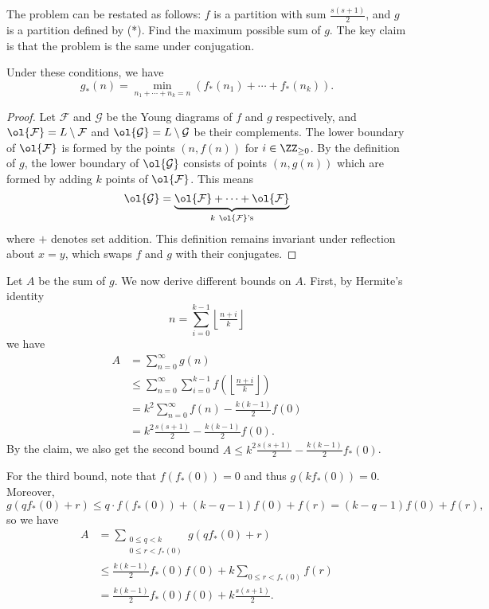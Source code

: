 \documentclass[11pt]{scrartcl}
\begin{document}
The problem can be restated as follows: $f$ is a partition with sum
$\frac{s(s+1)}{2}$, and $g$ is a partition defined by (*). Find the maximum
possible sum of $g$. The key claim is that the problem is the
same under conjugation.
\begin{claim*}
  Under these conditions, we have
  \[
    g_*(n) = \min_{n_1+\dotsb+n_k=n}(f_*(n_1)+\dotsb+f_*(n_k)).
  \]
\end{claim*}

\begin{proof}
  Let $\mathcal{F}$ and $\mathcal{G}$ be the Young diagrams of $f$ and $g$
  respectively, and $\ol{\mathcal{F}} = L\setminus \mathcal{F}$ and
  $\ol{\mathcal{G}} = L\setminus \mathcal{G}$ be their complements. The
  lower boundary of $\ol{\mathcal{F}}$ is formed by the points $(n, f(n))$
  for $i\in \ZZ_{\geq 0}$. By the definition of $g$, the lower boundary
  of $\ol{\mathcal{G}}$
  consists of points $(n, g(n))$ which are formed by adding $k$ points of
  $\ol{\mathcal{F}}$. This means
  \[
    \ol{\mathcal{G}} = \underbrace{\ol{\mathcal{F}} + \dots +
    \ol{\mathcal{F}}}_{k \ \ol{\mathcal{F}}\text{'s}}
  \]
  where $+$ denotes set addition. This definition remains invariant under
  reflection about $x=y$, which swaps $f$ and $g$ with their conjugates.
\end{proof}

Let $A$ be the sum of $g$. We now derive different bounds on $A$. First, by
Hermite's identity
\[n = \sum_{i=0}^{k-1}\left\lfloor\tfrac{n+i}{k}\right\rfloor\]
we have
\begin{align*}
  A &= \sum_{n=0}^{\infty} g(n) \\
    & \leq \sum_{n=0}^{\infty} \sum_{i=0}^{k-1} f\left( \left\lfloor
    \tfrac{n+i}{k} \right\rfloor \right) \\
    &= k^2 \sum_{n=0}^{\infty}f(n) - \frac{k(k-1)}{2}f(0) \\
    &= k^2\frac{s(s+1)}{2}-\frac{k(k-1)}{2}f(0).
\end{align*}
By the claim, we also get the second bound $A \leq k^2 \frac{s(s+1)}{2} -
\frac{k(k-1)}{2}f_*(0)$.

For the third bound, note that $f(f_*(0)) = 0$ and thus $g(k f_*(0)) = 0$. Moreover,
\[g(q f_*(0) + r) \le q \cdot f(f_*(0)) + (k-q-1) f(0) + f(r) = (k-q-1)f(0) +
f(r),\]
so we have
\begin{align*}
A &= \sum_{\substack{0 \leq q < k \\ 0 \leq r < f_*(0)}} g(qf_*(0) + r) \\
& \le \frac{k(k-1)}{2}f_*(0)f(0) + k \sum_{0 \leq r < f_*(0)} f(r) \\
&= \frac{k(k-1)}{2} f_*(0)f(0) + k\frac{s(s+1)}{2}.
\end{align*}
\end{document}
